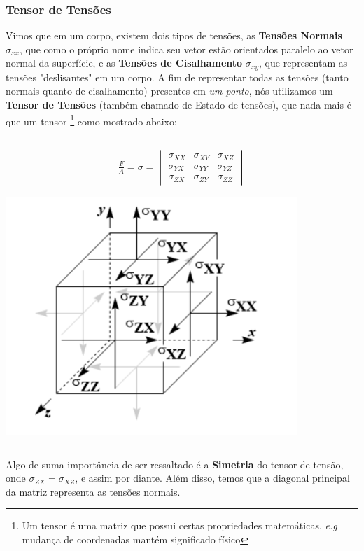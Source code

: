 \documentclass{article}
\begin{document}
\subsubsection*{Tensor de Tensões}

Vimos que em um corpo, existem dois tipos de tensões, as \textbf{Tensões Normais} $\sigma_{xx}$, que como o próprio nome indica seu vetor estão orientados paralelo ao vetor normal da superfície, e as \textbf{Tensões de Cisalhamento} $\sigma_{xy}$, que representam as tensões "deslisantes" em um corpo. A fim de representar todas as tensões (tanto normais quanto de cisalhamento) presentes em \emph{um ponto}, nós utilizamos um  \textbf{Tensor de Tensões} (também chamado de Estado de tensões), que nada mais é que um tensor \footnote{Um tensor é uma matriz que possui certas propriedades matemáticas, \emph{e.g} mudança de coordenadas mantém significado físico} como mostrado abaixo:

$$$$
\begin{minipage}{.5\textwidth}
    \begin{align*}
        \frac{F}{A} = \sigma = \begin{vmatrix}
                                   \sigma_{XX} & \sigma_{XY} & \sigma_{XZ} \\
                                   \sigma_{YX} & \sigma_{YY} & \sigma_{YZ} \\
                                   \sigma_{ZX} & \sigma_{ZY} & \sigma_{ZZ}
                               \end{vmatrix}
    \end{align*}
\end{minipage}
\begin{minipage}{.5\textwidth}
    \includegraphics[width=.5\textwidth]{imgs/tensões.png.png}
\end{minipage}
$$$$

Algo de suma importância de ser ressaltado é a \textbf{Simetria} do tensor de tensão, onde $\sigma_{ZX} = \sigma_{XZ}$, e assim por diante. Além disso, temos que a diagonal principal da matriz representa as tensões normais.
\end{document}
